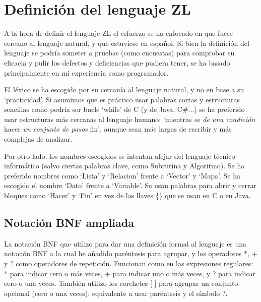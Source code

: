 \documentclass{report}
\begin{document}
	\section{Definición del lenguaje ZL}
	
	A la hora de definir el lenguaje ZL el esfuerzo se ha enfocado en que fuese cercano al lenguaje natural, y que estuviese en español\cite{mundoingles}. Si bien la definición del lenguaje se podría someter a pruebas (como encuestas) para comprobar su eficacia y pulir los defectos y deficiencias que pudiera tener, se ha basado principalmente en mi experiencia como programador. 
	
	\vspace{10px}
	
	El léxico se ha escogido por su cercanía al lenguaje natural, y no en base a su `practicidad'. Si asumimos que es práctico usar palabras cortas y estructuras sencillas como podría ser bucle `while' de C (y de Java, C\#...) se ha preferido usar estructuras más cercanas al lenguaje humano: `mientras \textit{se de una condición} hacer \textit{un conjunto de pasos} fin', aunque sean más largas de escribir y más complejas de analizar.
	
	\vspace{10px}
	
	Por otro lado, los nombres escogidos se intentan alejar del lenguaje técnico informático (salvo ciertas palabras clave, como Subrutina y Algoritmo). Se ha preferido nombres como `Lista' y `Relacion' frente a `Vector' y `Mapa'. Se ha escogido el nombre `Dato' frente a `Variable'. Se usan palabras para abrir y cerrar bloques como `Hacer' y `Fin' en vez de las llaves \{\} que se usan en C o en Java. 
	
	\vspace{10px}
	
	\subsection{Notación BNF ampliada}
	
	La notación BNF que utilizo para dar una definición formal al lenguaje es una notación BNF a la cual he añadido paréntesis para agrupar, y los operadores *, + y ? como operadores de repetición. Funcionan como en las expresiones regulares: * para indicar cero o más veces, + para indicar uno o más veces, y ? para indicar cero o una veces. También utilizo los corchetes [
	] para agrupar un conjunto opcional (cero o una veces), equivalente a usar paréntesis y el símbolo ?.
	
\end{document}

